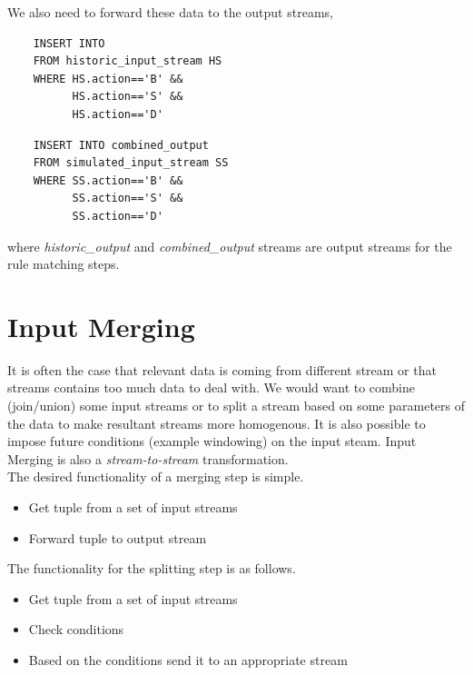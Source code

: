 \documentclass{article}
\begin{document}
\noindent We also need to forward these data to the output streams,

\begin{verbatim}   
    INSERT INTO  
    FROM historic_input_stream HS
    WHERE HS.action=='B' &&
          HS.action=='S' &&
          HS.action=='D'
\end{verbatim}

\begin{verbatim}  
    INSERT INTO combined_output
    FROM simulated_input_stream SS
    WHERE SS.action=='B' &&
          SS.action=='S' &&
          SS.action=='D'
\end{verbatim}

\noindent where \emph{historic\_output} and \emph{combined\_output} streams are output streams for the rule matching steps. 


\section{Input Merging}

It is often the case that relevant data is coming from different stream or that streams contains too much data to deal with. We would want to combine (join/union) some input streams or to split a stream based on some parameters of the data to make resultant streams more homogenous. It is also possible to impose future conditions (example windowing) on the input steam. Input Merging is also a \emph{stream-to-stream} transformation.
\\



The desired functionality of a merging step is simple.
\begin{itemize}
    \item Get tuple from a set of input streams
    \item Forward tuple to output stream
\end{itemize}

\noindent The functionality for the splitting step is as follows.

\begin{itemize}
    \item Get tuple from a set of input streams
    \item Check conditions
    \item Based on the conditions send it to an appropriate stream
\end{itemize}
\end{document}

